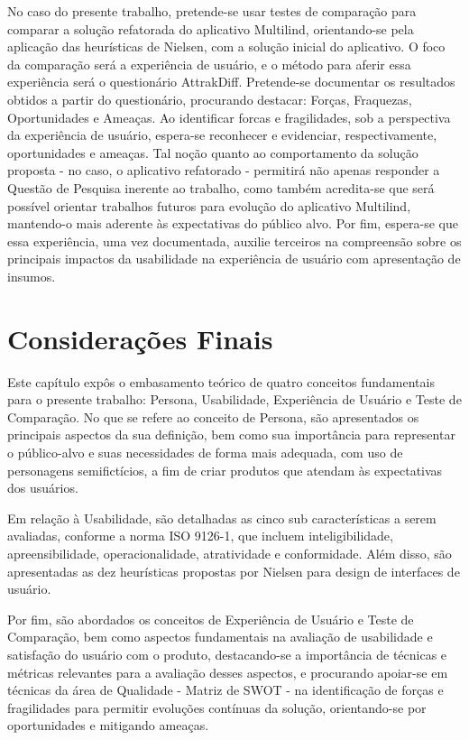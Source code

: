 No caso do presente trabalho, pretende-se usar testes de comparação para comparar a solução refatorada do aplicativo Multilind, orientando-se pela aplicação das heurísticas de Nielsen, com a solução inicial 
do aplicativo. O foco da comparação será a experiência de usuário, e o método para aferir essa experiência será o questionário AttrakDiff. Pretende-se documentar os resultados obtidos a partir do questionário, 
procurando destacar: Forças, Fraquezas, Oportunidades e Ameaças. Ao identificar forcas e fragilidades, sob a perspectiva da experiência de usuário, espera-se reconhecer e evidenciar, respectivamente, oportunidades 
e ameaças. Tal noção quanto ao comportamento da solução proposta - no caso, o aplicativo refatorado - permitirá não apenas responder a Questão de Pesquisa inerente ao trabalho, como também acredita-se que será 
possível orientar trabalhos futuros para evolução do aplicativo Multilind, mantendo-o mais aderente às expectativas do público alvo. Por fim, espera-se que essa experiência, uma vez documentada, auxilie terceiros 
na compreensão sobre os principais impactos da usabilidade na experiência de usuário com apresentação de insumos.


\section{Considerações Finais}
\label{sec:Considerações Finais}

Este capítulo expôs o embasamento teórico de quatro conceitos fundamentais para o presente trabalho: Persona, Usabilidade, Experiência de Usuário e Teste de Comparação. No que se 
refere ao conceito de Persona, são apresentados os principais aspectos da sua definição, bem como sua importância para representar o público-alvo e suas necessidades de forma mais adequada, 
com uso de personagens semifictícios, a fim de criar produtos que atendam às expectativas dos usuários. 

Em relação à Usabilidade, são detalhadas as cinco sub características a serem avaliadas, conforme a norma ISO 9126-1, que incluem inteligibilidade, apreensibilidade, operacionalidade, 
atratividade e conformidade. Além disso, são apresentadas as dez heurísticas propostas por Nielsen para design de interfaces de usuário. 

Por fim, são abordados os conceitos de Experiência de Usuário e Teste de Comparação, bem como aspectos fundamentais na avaliação de usabilidade e satisfação do usuário com o produto, 
destacando-se a importância de técnicas e métricas relevantes para a avaliação desses aspectos, e procurando apoiar-se em técnicas da área de Qualidade - Matriz de SWOT - na identificação de 
forças e fragilidades para permitir evoluções contínuas da solução, orientando-se por oportunidades e mitigando ameaças.